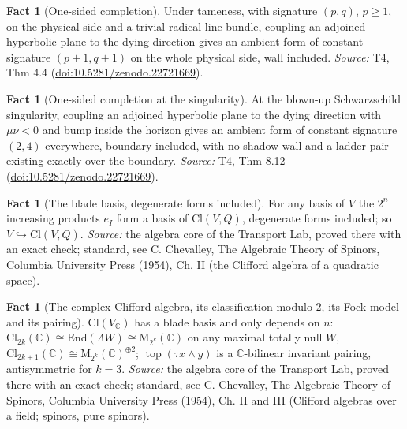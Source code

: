 \documentclass[11pt]{article}
\theoremstyle{definition}
\newtheorem{fact}[theorem]{Fact}
\theoremstyle{plain}
\providecommand{\C}{}\renewcommand{\C}{\mathbb{C}}
\providecommand{\Cl}{}\renewcommand{\Cl}{\mathrm{Cl}}
\providecommand{\End}{}\renewcommand{\End}{\mathrm{End}}
\providecommand{\Mat}{}\renewcommand{\Mat}{\mathrm{M}}
\begin{document}
\begin{fact}[One-sided completion]\label{c:sheaf.one-sided-completion}
Under tameness, with signature $(p,q)$, $p \geq 1$, on the physical side and a trivial radical line bundle, coupling an adjoined hyperbolic plane to the dying direction gives an ambient form of constant signature $(p{+}1, q{+}1)$ on the whole physical side, wall included.
\emph{Source:} T4, Thm 4.4 (\href{https://doi.org/10.5281/zenodo.22721669}{doi:10.5281/zenodo.22721669}).
\end{fact}

\begin{fact}[One-sided completion at the singularity]\label{c:sheaf.one-sided-completion-singularity}
At the blown-up Schwarzschild singularity, coupling an adjoined hyperbolic plane to the dying direction with $\mu\nu < 0$ and bump inside the horizon gives an ambient form of constant signature $(2,4)$ everywhere, boundary included, with no shadow wall and a ladder pair existing exactly over the boundary.
\emph{Source:} T4, Thm 8.12 (\href{https://doi.org/10.5281/zenodo.22721669}{doi:10.5281/zenodo.22721669}).
\end{fact}

\begin{fact}[The blade basis, degenerate forms included]\label{c:std-algebra.blade-basis}
For any basis of $V$ the $2^{n}$ increasing products $e_I$ form a basis of $\Cl(V, Q)$, degenerate forms included; so $V \hookrightarrow \Cl(V, Q)$.
\emph{Source:} the algebra core of the Transport Lab, proved there with an exact check; standard, see C. Chevalley, The Algebraic Theory of Spinors, Columbia University Press (1954), Ch. II (the Clifford algebra of a quadratic space).
\end{fact}

\begin{fact}[The complex Clifford algebra, its classification modulo 2, its Fock model and its pairing]\label{c:std-algebra.complex-clifford-algebra}
$\Cl(V_\C)$ has a blade basis and only depends on $n$: $\Cl_{2k}(\C) \cong \End(\Lambda W) \cong \Mat_{2^{k}}(\C)$ on any maximal totally null $W$, $\Cl_{2k+1}(\C) \cong \Mat_{2^{k}}(\C)^{\oplus 2}$; $\operatorname{top}(\tau x \wedge y)$ is a $\C$-bilinear invariant pairing, antisymmetric for $k = 3$.
\emph{Source:} the algebra core of the Transport Lab, proved there with an exact check; standard, see C. Chevalley, The Algebraic Theory of Spinors, Columbia University Press (1954), Ch. II and III (Clifford algebras over a field; spinors, pure spinors).
\end{fact}
\end{document}
